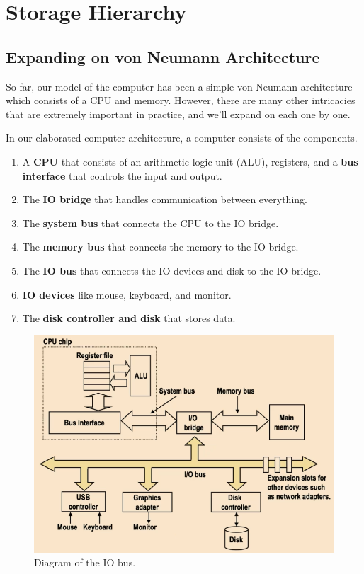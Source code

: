 \section{Storage Hierarchy}

\subsection{Expanding on von Neumann Architecture} 

  So far, our model of the computer has been a simple von Neumann architecture which consists of a CPU and memory. However, there are many other intricacies that are extremely important in practice, and we'll expand on each one by one. 
  
  \begin{definition}
    In our elaborated computer architecture, a computer consists of the components. 
    \begin{enumerate}
      \item A \textbf{CPU} that consists of an arithmetic logic unit (ALU), registers, and a \textbf{bus interface} that controls the input and output. 
      \item The \textbf{IO bridge} that handles communication between everything. 
      \item The \textbf{system bus} that connects the CPU to the IO bridge. 
      \item The \textbf{memory bus} that connects the memory to the IO bridge. 
      \item The \textbf{IO bus} that connects the IO devices and disk to the IO bridge. 
      \item \textbf{IO devices} like mouse, keyboard, and monitor. 
      \item The \textbf{disk controller and disk} that stores data. 
    \end{enumerate} 
    \begin{figure}[H]
      \centering 
      \includegraphics[scale=0.4]{img/io.png}
      \caption{Diagram of the IO bus.} 
      \label{fig:io}
    \end{figure}
  \end{definition}

